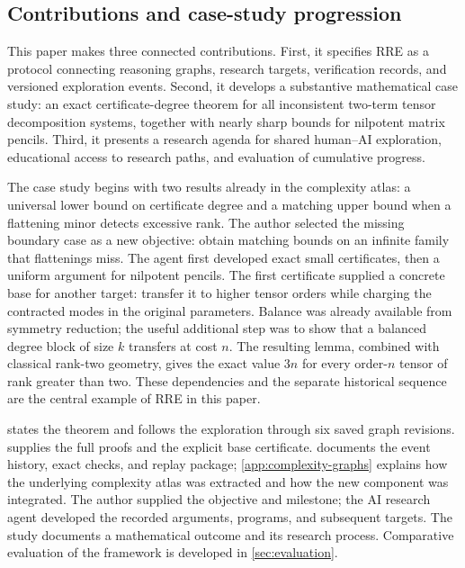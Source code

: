 \subsection{Contributions and case-study progression}

This paper makes three connected contributions. First, it specifies RRE as a protocol connecting reasoning graphs, research targets, verification records, and versioned exploration events. Second, it develops a substantive mathematical case study: an exact certificate-degree theorem for all inconsistent two-term tensor decomposition systems, together with nearly sharp bounds for nilpotent matrix pencils. Third, it presents a research agenda for shared human--AI exploration, educational access to research paths, and evaluation of cumulative progress.

The case study begins with two results already in the complexity atlas: a universal lower bound on certificate degree and a matching upper bound when a flattening minor detects excessive rank. The author selected the missing boundary case as a new objective: obtain matching bounds on an infinite family that flattenings miss. The agent first developed exact small certificates, then a uniform argument for nilpotent pencils. The first certificate supplied a concrete base for another target: transfer it to higher tensor orders while charging the contracted modes in the original parameters. Balance was already available from symmetry reduction; the useful additional step was to show that a balanced degree block of size $k$ transfers at cost $n$. The resulting lemma, combined with classical rank-two geometry, gives the exact value $3n$ for every order-$n$ tensor of rank greater than two. These dependencies and the separate historical sequence are the central example of RRE in this paper.

 states the theorem and follows the exploration through six saved graph revisions.  supplies the full proofs and the explicit base certificate.  documents the event history, exact checks, and replay package; \cref{app:complexity-graphs} explains how the underlying complexity atlas was extracted and how the new component was integrated. The author supplied the objective and milestone; the AI research agent developed the recorded arguments, programs, and subsequent targets. The study documents a mathematical outcome and its research process. Comparative evaluation of the framework is developed in \cref{sec:evaluation}.

